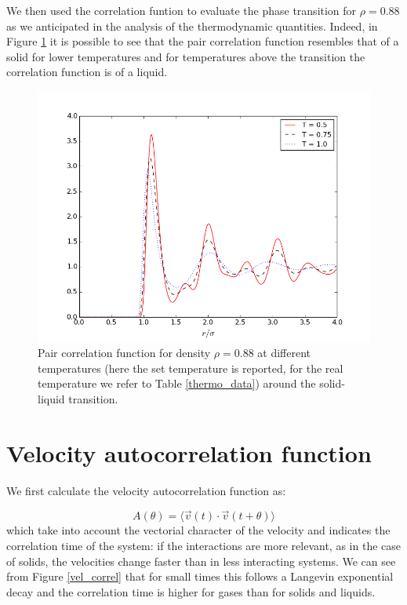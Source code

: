\documentclass[aps,prl,reprint,groupedaddress]{revtex4-1}
\begin{document}
We then used the correlation funtion to evaluate the phase transition for $\rho = 0.88$ as we anticipated in the analysis of the thermodynamic quantities. Indeed, in Figure \ref{phase_trans} it is possible to see that the pair correlation function resembles that of a solid for lower temperatures and for temperatures above the transition the correlation function is of a liquid.

\begin{figure}[ht]
	\includegraphics[scale=0.4]{phase_trans.png}
	\caption{Pair correlation function for density $\rho=0.88$ at different temperatures (here the set temperature is reported, for the real temperature we refer to Table \ref{thermo_data}) around the solid-liquid transition. \label{phase_trans}}
\end{figure}

\section{Velocity autocorrelation function \label{decay}}

We first calculate the velocity autocorrelation function as:

\begin{equation}\label{eq_vel_correl}
	A(\theta) = \langle \vec{v}(t) \cdot \vec{v}(t+\theta) \rangle
\end{equation}
which take into account the vectorial character of the velocity and indicates the correlation time of the system: if the interactions are more relevant, as in the case of solids, the velocities change faster than in less interacting systems. We can see from Figure \ref{vel_correl} that for small times this follows a Langevin exponential decay \cite{Rahman1964} and the correlation time is higher for gases than for solids and liquids.
\end{document}
